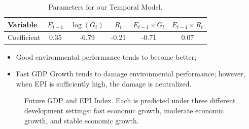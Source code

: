     \begin{table}[htbp]
        \centering
        \begin{tabular}{|l|ccccc|} \hline
            Variable & $E_{t-1}$ & $\log(G_t)$ & $R_t$ & $\overline{E_{t-1}}\times\overline{G_t}$ & $\overline{E_{t-1}}\times\overline{R_t}$
            \\ \hline
            Coefficient & 0.35 & -6.79 & -0.21 & -0.71 & 0.07 
            \\ \hline
        \end{tabular}
        \caption{Parameters for our Temporal Model.}
        \label{tab:exp:temporal:params}
    \end{table}
    \begin{itemize}
       \item Good environmental performance tends to become better;
       \item Fast GDP Growth tends to damage environmental performance; however, when EPI is sufficiently high, the damage is neutralized.
    \end{itemize}


\begin{figure}[htbp]
    \centering
    \caption{Future GDP and EPI Index. Each is predicted under three different development settings: fast economic growth, moderate economic growth, and stable economic growth.}
    \label{fig:exp:future}
\end{figure}

